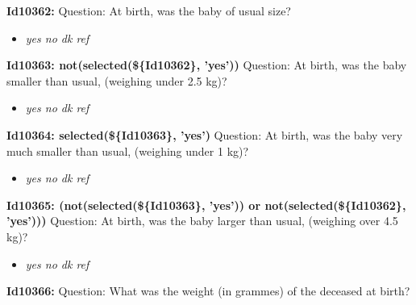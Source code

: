 \documentclass{article}%
\begin{document}
\textbf{Id10362: \newline%
}%
Question: At birth, was the baby of usual size?\newline%
%
\begin{itemize}%
\item%
\textit{yes\newline%
 no\newline%
 dk\newline%
 ref\newline%
}%
\end{itemize}%
\textbf{Id10363: not(selected(\$\{Id10362\}, 'yes')) \newline%
}%
Question: At birth, was the baby smaller than usual, (weighing under 2.5 kg)?\newline%
%
\begin{itemize}%
\item%
\textit{yes\newline%
 no\newline%
 dk\newline%
 ref\newline%
}%
\end{itemize}%
\textbf{Id10364: selected(\$\{Id10363\}, 'yes')\newline%
}%
Question: At birth, was the baby very much smaller than usual, (weighing under 1 kg)?\newline%
%
\begin{itemize}%
\item%
\textit{yes\newline%
 no\newline%
 dk\newline%
 ref\newline%
}%
\end{itemize}%
\textbf{Id10365: (not(selected(\$\{Id10363\}, 'yes')) or not(selected(\$\{Id10362\}, 'yes')))\newline%
}%
Question: At birth, was the baby larger than usual, (weighing over 4.5 kg)?\newline%
%
\begin{itemize}%
\item%
\textit{yes\newline%
 no\newline%
 dk\newline%
 ref\newline%
}%
\end{itemize}%
\textbf{Id10366: \newline%
}%
Question: What was the weight (in grammes) of the deceased at birth?\newline%
\end{document}
